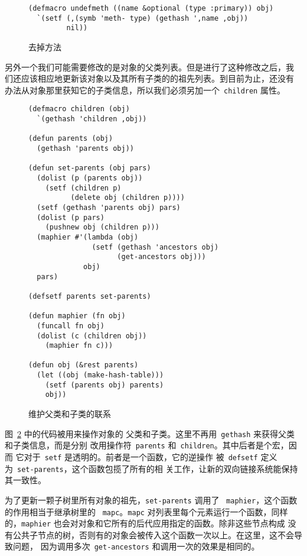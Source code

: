 \begin{figure}
\begin{lstlisting}
(defmacro undefmeth ((name &optional (type :primary)) obj)
  `(setf (,(symb 'meth- type) (gethash ',name ,obj))
         nil))
\end{lstlisting}
\caption{\label{fig:removing_methods}去掉方法}
\end{figure}

另外一个我们可能需要修改的是对象的父类列表。但是进行了这种修改之后，我
们还应该相应地更新该对象以及其所有子类的的祖先列表。到目前为止，还没有
办法从对象那里获知它的子类信息，所以我们必须另加一个~\texttt{children}
属性。

\begin{figure}
\begin{lstlisting}
(defmacro children (obj)
  `(gethash 'children ,obj))

(defun parents (obj)
  (gethash 'parents obj))

(defun set-parents (obj pars)
  (dolist (p (parents obj))
    (setf (children p)
          (delete obj (children p))))
  (setf (gethash 'parents obj) pars)
  (dolist (p pars)
    (pushnew obj (children p)))
  (maphier #'(lambda (obj)
               (setf (gethash 'ancestors obj)
                     (get-ancestors obj)))
             obj)
  pars)

(defsetf parents set-parents)

(defun maphier (fn obj)
  (funcall fn obj)
  (dolist (c (children obj))
    (maphier fn c)))

(defun obj (&rest parents)
  (let ((obj (make-hash-table)))
    (setf (parents obj) parents)
    obj))
\end{lstlisting}
\caption{\label{fig:maintaining_parent_n_child_links}维护父类和子类的联系}
\end{figure}
图~\ref{fig:maintaining_parent_n_child_links} 中的代码被用来操作对象的
父类和子类。这里不再用~\texttt{gethash} 来获得父类和子类信息，而是分别
改用操作符~\texttt{parents} 和~\texttt{children}。其中后者是个宏，因而
它对于~\texttt{setf} 是透明的。前者是一个函数，它的逆操作
被~\texttt{defsetf} 定义为~\texttt{set-parents}，这个函数包揽了所有的相
关工作，让新的双向链接系统能保持其一致性。

为了更新一颗子树里所有对象的祖先，\texttt{set-parents} 调用了
~\texttt{maphier}，这个函数的作用相当于继承树里的
~\texttt{mapc}。\texttt{mapc} 对列表里每个元素运行一个函数，同样
的，\texttt{maphier} 也会对对象和它所有的后代应用指定的函数。除非这些节点构成
没有公共子节点的树，否则有的对象会被传入这个函数一次以上。在这里，这不会导致问题，
因为调用多次~\texttt{get-ancestors} 和调用一次的效果是相同的。

